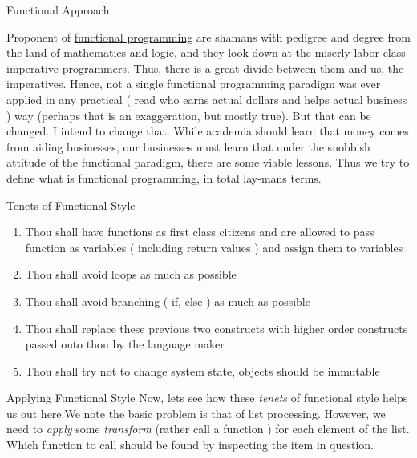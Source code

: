 \begin{section}{Functional Approach}\label{functional}

Proponent of \href{https://en.wikipedia.org/wiki/Functional_programming}{functional programming} 
are shamans with pedigree and degree from the land of mathematics and logic, 
and they look down at the miserly labor class \href{https://en.wikipedia.org/wiki/Imperative_programming}{imperative programmers}. 
Thus, there is a great divide between them and us, the imperatives. Hence, not a single functional programming paradigm was ever applied in any practical ( read who earns actual dollars and helps actual business ) way (perhaps that is an exaggeration, but mostly true). 
But that can be changed. I intend to change that. While academia should learn that money comes from aiding businesses, our businesses must learn that under the snobbish attitude of the functional paradigm, there are some viable lessons. 
Thus we try to define what is functional programming, in total lay-mans terms.


\begin{subsection}{Tenets of Functional Style}\label{functional-tenet}

\begin{enumerate}
\item{Thou shall have functions as first class citizens and are allowed to pass function as variables 
   ( including return values ) and assign them to variables }
\item{Thou shall avoid loops as much as possible}
\item{Thou shall avoid branching ( if, else ) as much as possible}
\item{Thou shall replace these previous two constructs with higher order constructs passed onto thou by the language maker}
\item{Thou shall try not to change system state, objects should be immutable}

\end{enumerate}

\end{subsection}


\begin{subsection}{Applying Functional Style}\label{apply-functional}
Now, lets see how these \emph{tenets} of functional style helps us out here.We note the basic problem is that of list processing. 
However, we need to \emph{apply} some \emph{transform} (rather call a function ) for each element of the list.
Which function to call should be found by inspecting the item in question.


\end{subsection}
\end{section}
